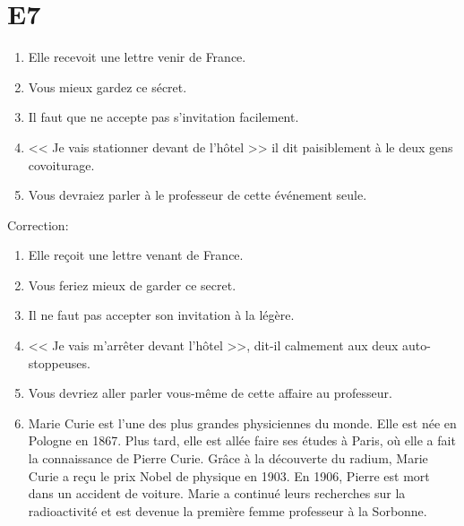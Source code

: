 \documentclass{book}
\begin{document}
    \section{E7}
        \begin{enumerate}
            \item Elle recevoit une lettre venir de France.
            \item Vous mieux gardez ce sécret.
            \item Il faut que ne accepte pas s'invitation facilement.
            \item << Je vais stationner devant de l'hôtel >> il dit paisiblement à le deux gens covoiturage.
            \item Vous devraiez parler à le professeur de cette événement seule.
        \end{enumerate}
        Correction:
        \begin{enumerate}
            \item Elle reçoit une lettre venant de France.
            \item Vous feriez mieux de garder ce secret.
            \item Il ne faut pas accepter son invitation à la légère.
            \item << Je vais m'arrêter devant l'hôtel >>, dit-il calmement aux deux auto-stoppeuses.
            \item Vous devriez aller parler vous-même de cette affaire au professeur.
            \item Marie Curie est l'une des plus grandes physiciennes du monde. Elle est née en Pologne en 1867. Plus tard, elle est allée faire ses études à Paris, où elle a fait la connaissance de Pierre Curie. Grâce à la découverte du radium, Marie Curie a reçu le prix Nobel de physique en 1903. En 1906, Pierre est mort dans un accident de voiture. Marie a continué leurs recherches sur la radioactivité et est devenue la première femme professeur à la Sorbonne.
        \end{enumerate}
\end{document}

